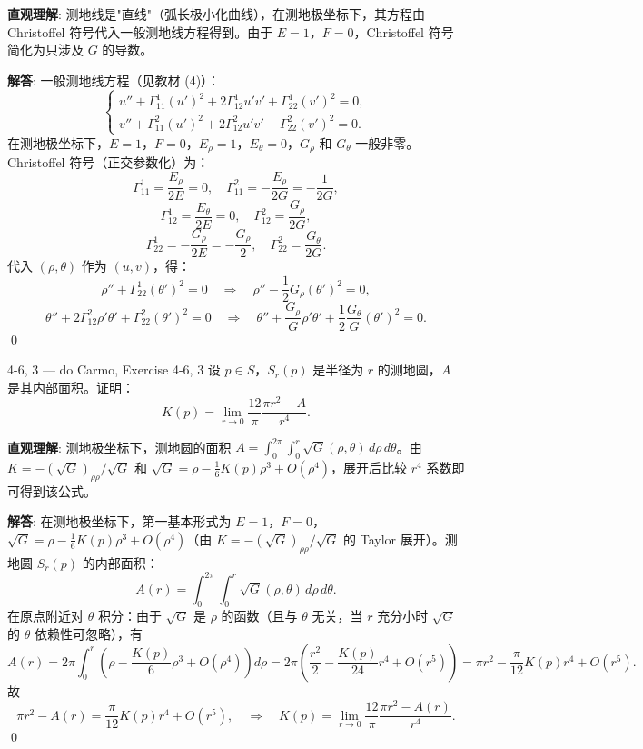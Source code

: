 \begin{solution}
\textbf{直观理解}: 测地线是"直线"（弧长极小化曲线），在测地极坐标下，其方程由 Christoffel 符号代入一般测地线方程得到。由于 $E=1$，$F=0$，Christoffel 符号简化为只涉及 $G$ 的导数。

\textbf{解答}: 一般测地线方程（见教材 (4)）：
\[
\begin{cases}
u'' + \Gamma_{11}^1(u')^2 + 2\Gamma_{12}^1 u'v' + \Gamma_{22}^1(v')^2 = 0,\\
v'' + \Gamma_{11}^2(u')^2 + 2\Gamma_{12}^2 u'v' + \Gamma_{22}^2(v')^2 = 0.
\end{cases}
\]
在测地极坐标下，$E=1$，$F=0$，$E_\rho = 1$，$E_\theta = 0$，$G_\rho$ 和 $G_\theta$ 一般非零。Christoffel 符号（正交参数化）为：
\[
\Gamma_{11}^1 = \frac{E_\rho}{2E} = 0,\quad \Gamma_{11}^2 = -\frac{E_\rho}{2G} = -\frac{1}{2G},
\]
\[
\Gamma_{12}^1 = \frac{E_\theta}{2E} = 0,\quad \Gamma_{12}^2 = \frac{G_\rho}{2G},
\]
\[
\Gamma_{22}^1 = -\frac{G_\rho}{2E} = -\frac{G_\rho}{2},\quad \Gamma_{22}^2 = \frac{G_\theta}{2G}.
\]
代入 $(\rho,\theta)$ 作为 $(u,v)$，得：
\[
\rho'' + \Gamma_{22}^1(\theta')^2 = 0 \quad\Longrightarrow\quad \rho'' - \frac{1}{2}G_\rho(\theta')^2 = 0,
\]
\[
\theta'' + 2\Gamma_{12}^2\rho'\theta' + \Gamma_{22}^2(\theta')^2 = 0 \quad\Longrightarrow\quad
\theta'' + \frac{G_\rho}{G}\rho'\theta' + \frac{1}{2}\frac{G_\theta}{G}(\theta')^2 = 0.
\]
\qed
\end{solution}

\begin{exercise}{4-6, 3 — do Carmo, Exercise 4-6, 3}
设 $p \in S$，$S_r(p)$ 是半径为 $r$ 的测地圆，$A$ 是其内部面积。证明：
\[
K(p) = \lim_{r\to 0} \frac{12}{\pi}\frac{\pi r^2 - A}{r^4}.
\]
\end{exercise}

\begin{solution}
\textbf{直观理解}: 测地极坐标下，测地圆的面积 $A = \int_0^{2\pi}\int_0^r \sqrt{G}(\rho,\theta)\, d\rho\, d\theta$。由 $K = -(\sqrt{G})_{\rho\rho}/\sqrt{G}$ 和 $\sqrt{G} = \rho - \frac{1}{6}K(p)\rho^3 + O(\rho^4)$，展开后比较 $r^4$ 系数即可得到该公式。

\textbf{解答}: 在测地极坐标下，第一基本形式为 $E=1$，$F=0$，$\sqrt{G} = \rho - \frac{1}{6}K(p)\rho^3 + O(\rho^4)$（由 $K = -(\sqrt{G})_{\rho\rho}/\sqrt{G}$ 的 Taylor 展开）。测地圆 $S_r(p)$ 的内部面积：
\[
A(r) = \int_0^{2\pi}\!\int_0^r \sqrt{G}(\rho,\theta)\, d\rho\, d\theta.
\]
在原点附近对 $\theta$ 积分：由于 $\sqrt{G}$ 是 $\rho$ 的函数（且与 $\theta$ 无关，当 $r$ 充分小时 $\sqrt{G}$ 的 $\theta$ 依赖性可忽略），有
\[
A(r) = 2\pi\int_0^r \left(\rho - \frac{K(p)}{6}\rho^3 + O(\rho^4)\right)d\rho = 2\pi\left(\frac{r^2}{2} - \frac{K(p)}{24}r^4 + O(r^5)\right) = \pi r^2 - \frac{\pi}{12}K(p)r^4 + O(r^5).
\]
故
\[
\pi r^2 - A(r) = \frac{\pi}{12}K(p)r^4 + O(r^5),
\quad\Longrightarrow\quad
K(p) = \lim_{r\to 0}\frac{12}{\pi}\frac{\pi r^2 - A(r)}{r^4}.
\]
\qed
\end{solution}

